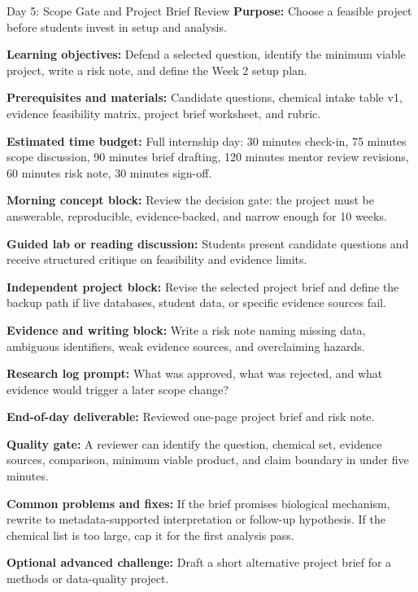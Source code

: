 \begin{dailybox}{Day 5: Scope Gate and Project Brief Review}
\textbf{Purpose:} Choose a feasible project before students invest in setup and analysis.

\textbf{Learning objectives:} Defend a selected question, identify the minimum viable project, write a risk note, and define the Week 2 setup plan.

\textbf{Prerequisites and materials:} Candidate questions, chemical intake table v1, evidence feasibility matrix, project brief worksheet, and rubric.

\textbf{Estimated time budget:} Full internship day: 30 minutes check-in, 75 minutes scope discussion, 90 minutes brief drafting, 120 minutes mentor review revisions, 60 minutes risk note, 30 minutes sign-off.

\textbf{Morning concept block:} Review the decision gate: the project must be answerable, reproducible, evidence-backed, and narrow enough for 10 weeks.

\textbf{Guided lab or reading discussion:} Students present candidate questions and receive structured critique on feasibility and evidence limits.

\textbf{Independent project block:} Revise the selected project brief and define the backup path if live databases, student data, or specific evidence sources fail.

\textbf{Evidence and writing block:} Write a risk note naming missing data, ambiguous identifiers, weak evidence sources, and overclaiming hazards.

\textbf{Research log prompt:} What was approved, what was rejected, and what evidence would trigger a later scope change?

\textbf{End-of-day deliverable:} Reviewed one-page project brief and risk note.

\textbf{Quality gate:} A reviewer can identify the question, chemical set, evidence sources, comparison, minimum viable product, and claim boundary in under five minutes.

\textbf{Common problems and fixes:} If the brief promises biological mechanism, rewrite to metadata-supported interpretation or follow-up hypothesis. If the chemical list is too large, cap it for the first analysis pass.

\textbf{Optional advanced challenge:} Draft a short alternative project brief for a methods or data-quality project.
\end{dailybox}

